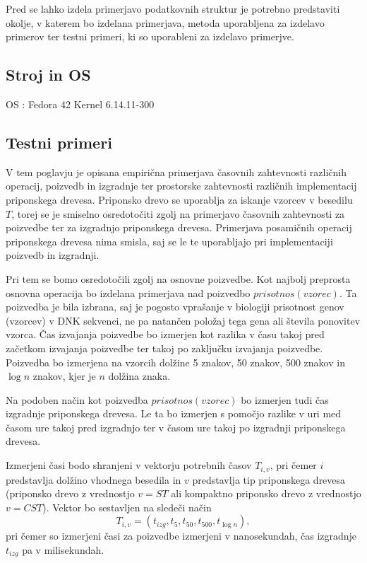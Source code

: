 Pred se lahko izdela primerjavo podatkovnih struktur je potrebno predstaviti okolje, v katerem bo izdelana primerjava, metoda uporabljena za izdelavo primerov ter testni primeri, ki so uporableni za izdelavo primerjve.

\subsection{Stroj in OS}

OS : Fedora 42
Kernel 6.14.11-300

\subsection{Testni primeri}

V tem poglavju je opisana empirična primerjava časovnih zahtevnosti različnih operacij, poizvedb in izgradnje ter prostorske zahtevnosti različnih implementacij priponskega drevesa. Priponsko drevo se uporablja za iskanje vzorcev v besedilu $T$, torej se je smiselno osredotočiti zgolj na primerjavo časovnih zahtevnosti za poizvedbe ter za izgradnjo priponskega drevesa. Primerjava posamičnih operacij priponskega drevesa nima smisla, saj se le te uporabljajo pri implementaciji poizvedb in izgradnji. 

Pri tem se bomo osredotočili zgolj na osnovne poizvedbe. Kot najbolj preprosta osnovna operacija bo izdelana primerjava nad poizvedbo $prisotnos(vzorec)$. Ta poizvedba je bila izbrana, saj je pogosto vprašanje v biologiji prisotnost genov (vzorcev) v DNK sekvenci, ne pa natančen položaj tega gena ali števila ponovitev vzorca. Čas izvajanja poizvedbe bo izmerjen kot razlika v času takoj pred začetkom izvajanja poizvedbe ter takoj po zaključku izvajanja poizvedbe. Poizvedba bo izmerjena na vzorcih dolžine 5 znakov, 50 znakov, 500 znakov in $\log{n}$ znakov, kjer je $n$ dolžina znaka. 

Na podoben način kot poizvedba $prisotnos(vzorec)$ bo izmerjen tudi čas izgradnje priponskega drevesa. Le ta bo izmerjen s pomočjo razlike v uri med časom ure takoj pred izgradnjo ter v časom ure takoj po izgradnji priponskega drevesa.

Izmerjeni časi bodo shranjeni v vektorju potrebnih časov $T_{i,v}$, pri čemer $i$ predstavlja dolžino vhodnega besedila in $v$ predstavlja tip priponskega drevesa (priponsko drevo z vrednostjo $v=ST$ ali kompaktno priponsko drevo z vrednostjo $v=CST$). Vektor bo sestavljen na sledeči način
\begin{equation*}
    T_{i,v}=(t_{izg},t_5,t_{50},t_{500},t_{\log{n}}),
\end{equation*}
pri čemer so izmerjeni časi za poizvedbe izmerjeni v nanosekundah, čas izgradnje $t_{izg}$ pa v milisekundah. 

